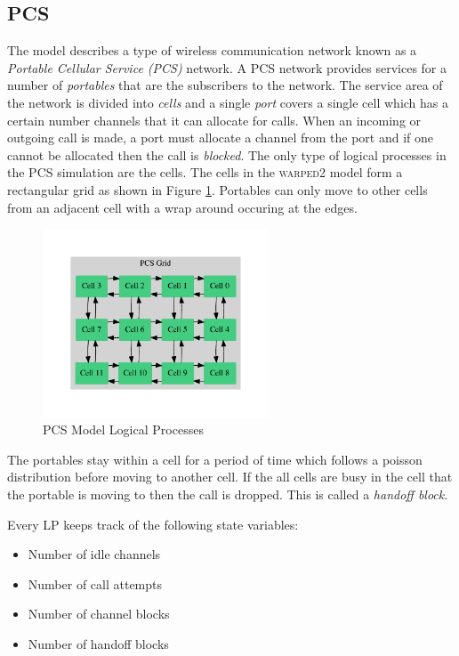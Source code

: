 \documentclass[11pt]{book}
\begin{document}
\subsection{PCS}

The model describes a type of wireless communication network known as a \emph{Portable Cellular
  Service (PCS)} network.  A PCS network provides services for a number of \emph{portables} that are
the subscribers to the network.  The service area of the network is divided into \emph{cells} and a
single \emph{port} covers a single cell which has a certain number channels that it can allocate for
calls.  When an incoming or outgoing call is made, a port must allocate a channel from the port and
if one cannot be allocated then the call is \emph{blocked}\cite{lin-96b}.  The only type of logical
processes in the PCS simulation are the cells.  The cells in the \textsc{warped2} model form a
rectangular grid as shown in Figure \ref{pcs_model_lps}.  Portables can only move to other cells
from an adjacent cell with a wrap around occuring at the edges.

\begin{figure}
    \centering
    \includegraphics[width=0.6\textwidth,quiet]{figs/graphviz/pcs_model.pdf}
    \caption{PCS Model Logical Processes}\label{pcs_model_lps}
\end{figure}

The portables stay within a cell for a period of time which follows a poisson distribution
before moving to another cell.  If the all cells are busy in the cell that the portable
is moving to then the call is dropped.  This is called a \emph{handoff block}.

Every LP keeps track of the following state variables:
\begin{itemize}
    \item Number of idle channels
    \item Number of call attempts
    \item Number of channel blocks
    \item Number of handoff blocks
\end{itemize}
\end{document}
